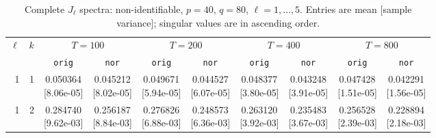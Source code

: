\documentclass[12pt,letterpaper]{article}
\def\spacingset#1{\renewcommand{\baselinestretch}{#1}\small\normalsize}
\theoremstyle{plain}
\theoremstyle{definition}
\begin{document}
\clearpage
\begin{table}[p]
\begingroup
\spacingset{1.0}
\small\centering
\caption{Complete $J_\ell$ spectra: non-identifiable, $p=40$, $q=80$, $\ell=1,\ldots,5$. Entries are mean [sample variance]; singular values are in ascending order.}
\label{s23:lambda:alltab:spectra:p40q80exterior:1-5}
\footnotesize
\setlength{\tabcolsep}{2.2pt}
\renewcommand{\arraystretch}{1.03}
\begin{adjustbox}{max width=\linewidth}
\begin{tabular}{@{}rr*{8}{c}@{}}
\toprule
$\ell$ & $k$ & \multicolumn{2}{c}{$T=100$} & \multicolumn{2}{c}{$T=200$} & \multicolumn{2}{c}{$T=400$} & \multicolumn{2}{c}{$T=800$}\\
\cmidrule(lr){3-4}\cmidrule(lr){5-6}\cmidrule(lr){7-8}\cmidrule(lr){9-10}
 &  & \texttt{orig} & \texttt{nor} & \texttt{orig} & \texttt{nor} & \texttt{orig} & \texttt{nor} & \texttt{orig} & \texttt{nor}\\
\midrule
1 & 1 & \shortstack{0.050364\\[-1pt]{\scriptsize[8.06e-05]}} & \shortstack{0.045212\\[-1pt]{\scriptsize[8.02e-05]}} & \shortstack{0.049671\\[-1pt]{\scriptsize[5.94e-05]}} & \shortstack{0.044527\\[-1pt]{\scriptsize[6.07e-05]}} & \shortstack{0.048377\\[-1pt]{\scriptsize[3.80e-05]}} & \shortstack{0.043248\\[-1pt]{\scriptsize[3.91e-05]}} & \shortstack{0.047428\\[-1pt]{\scriptsize[1.51e-05]}} & \shortstack{0.042291\\[-1pt]{\scriptsize[1.56e-05]}}\\
1 & 2 & \shortstack{0.284740\\[-1pt]{\scriptsize[9.62e-03]}} & \shortstack{0.256187\\[-1pt]{\scriptsize[8.84e-03]}} & \shortstack{0.276826\\[-1pt]{\scriptsize[6.88e-03]}} & \shortstack{0.248573\\[-1pt]{\scriptsize[6.36e-03]}} & \shortstack{0.263120\\[-1pt]{\scriptsize[3.92e-03]}} & \shortstack{0.235483\\[-1pt]{\scriptsize[3.67e-03]}} & \shortstack{0.256528\\[-1pt]{\scriptsize[2.39e-03]}} & \shortstack{0.228894\\[-1pt]{\scriptsize[2.18e-03]}}\\

\end{tabular}
\end{adjustbox}
\end{table}
\end{document}
